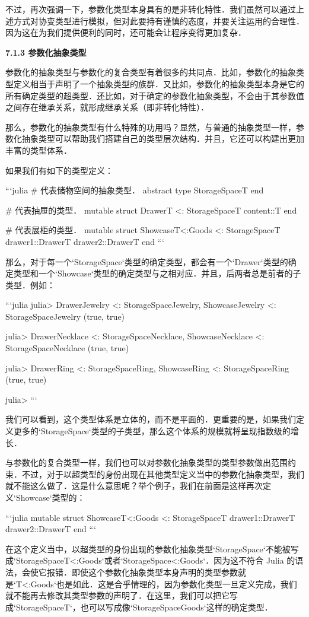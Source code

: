不过，再次强调一下，参数化类型本身具有的是非转化特性．我们虽然可以通过上述方式对协变类型进行模拟，但对此要持有谨慎的态度，并要关注运用的合理性．因为这在为我们提供便利的同时，还可能会让程序变得更加复杂．

\textbf{7.1.3 参数化抽象类型}

参数化的抽象类型与参数化的复合类型有着很多的共同点．比如，参数化的抽象类型定义相当于声明了一个抽象类型的族群．又比如，参数化的抽象类型本身是它的所有确定类型的超类型．还比如，对于确定的参数化抽象类型，不会由于其参数值之间存在继承关系，就形成继承关系（即非转化特性）．

那么，参数化的抽象类型有什么特殊的功用吗？显然，与普通的抽象类型一样，参数化抽象类型可以帮助我们搭建自己的类型层次结构．并且，它还可以构建出更加丰富的类型体系．

如果我们有如下的类型定义：

```julia
# 代表储物空间的抽象类型．
abstract type StorageSpace{T} end

# 代表抽屉的类型．
mutable struct Drawer{T} <: StorageSpace{T}
    content::T
end

# 代表展柜的类型．
mutable struct Showcase{T<:Goods} <: StorageSpace{T}
    drawer1::Drawer{T}
    drawer2::Drawer{T}
end
```

那么，对于每一个`StorageSpace`类型的确定类型，都会有一个`Drawer`类型的确定类型和一个`Showcase`类型的确定类型与之相对应．并且，后两者总是前者的子类型．例如：

```julia
julia> Drawer{Jewelry} <: StorageSpace{Jewelry}, Showcase{Jewelry} <: StorageSpace{Jewelry}
(true, true)

julia> Drawer{Necklace} <: StorageSpace{Necklace}, Showcase{Necklace} <: StorageSpace{Necklace}
(true, true)

julia> Drawer{Ring} <: StorageSpace{Ring}, Showcase{Ring} <: StorageSpace{Ring}
(true, true)

julia> 
```

我们可以看到，这个类型体系是立体的，而不是平面的．更重要的是，如果我们定义更多的`StorageSpace`类型的子类型，那么这个体系的规模就将呈现指数级的增长．

与参数化的复合类型一样，我们也可以对参数化抽象类型的类型参数做出范围约束．不过，对于以超类型的身份出现在其他类型定义当中的参数化抽象类型，我们就不能这么做了．这是什么意思呢？举个例子，我们在前面是这样再次定义`Showcase`类型的：

```julia
mutable struct Showcase{T<:Goods} <: StorageSpace{T}
    drawer1::Drawer{T}
    drawer2::Drawer{T}
end
```

在这个定义当中，以超类型的身份出现的参数化抽象类型`StorageSpace`不能被写成`StorageSpace{T<:Goods}`或者`StorageSpace{<:Goods}`．因为这不符合 Julia 的语法，会使它报错．即使这个参数化抽象类型本身声明的类型参数就是`{T<:Goods}`也是如此．这是合乎情理的，因为参数化类型一旦定义完成，我们就不能再去修改其类型参数的声明了．在这里，我们可以把它写成`StorageSpace{T}`，也可以写成像`StorageSpace{Goods}`这样的确定类型．

